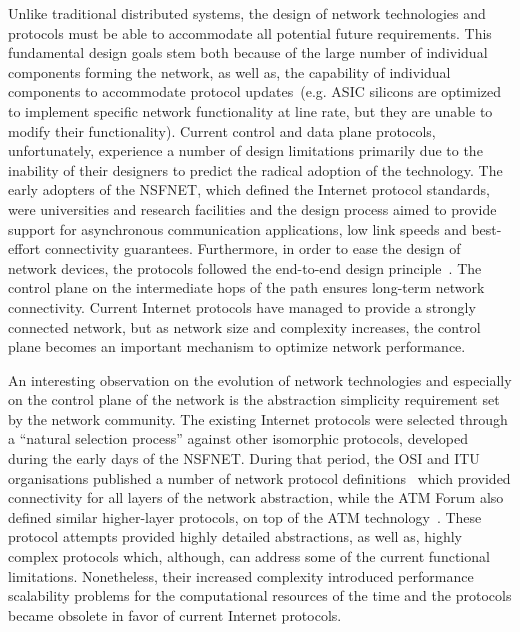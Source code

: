 Unlike traditional distributed systems, the design of network technologies and
protocols must be able to accommodate all potential future requirements. This
fundamental design goals stem both because of the large number of individual
components forming the network, as well as, the capability of individual
components to accommodate protocol updates~(e.g. ASIC silicons are optimized to
implement specific network functionality at line rate, but they are unable to
modify their functionality).  Current control and data plane protocols,
unfortunately,  experience a number of design limitations primarily due to the
inability of their designers to predict the radical adoption of the technology.
The early adopters of the NSFNET, which defined the Internet protocol standards,
were universities and research facilities and the design process aimed to
provide support for asynchronous communication applications, low link speeds and
best-effort connectivity guarantees. Furthermore, in order to ease the design of
network devices, the protocols followed the end-to-end design
principle~\cite{end2endIP}. The control plane on the intermediate hops of the
path ensures long-term network connectivity.  Current Internet protocols have
managed to provide a strongly connected network, but as network size and
complexity increases, the control plane becomes an important mechanism to
optimize network performance.

An interesting observation on the evolution of network technologies and
especially on the control plane of the network is the abstraction simplicity
requirement set by the network community.  The existing Internet protocols were
selected through a ``natural selection process'' against other isomorphic
protocols, developed during the early days of the NSFNET\@. During that period,
the OSI and ITU organisations published a number of network protocol
definitions~\cite{x.213,x.233} which provided connectivity for all layers of the
network abstraction, while the ATM Forum also defined similar higher-layer
protocols, on top of the ATM technology~\cite{Siu95}. These protocol attempts
provided highly detailed abstractions, as well as, highly complex protocols
which, although, can address some of the current functional limitations.
Nonetheless, their increased complexity introduced performance scalability
problems for the computational resources of the time and the protocols became
obsolete in favor of current Internet protocols.

